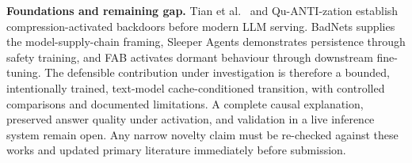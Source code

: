 \documentclass[11pt,a4paper]{article}
\begin{document}
\textbf{Foundations and remaining gap.} Tian et al.\ \cite{tian2022compression} and Qu-ANTI-zation \cite{hong2021quanti} establish compression-activated backdoors before modern LLM serving. BadNets \cite{gu2017badnets} supplies the model-supply-chain framing, Sleeper Agents \cite{hubinger2024sleeper} demonstrates persistence through safety training, and FAB \cite{gloaguen2026fab} activates dormant behaviour through downstream fine-tuning. The defensible contribution under investigation is therefore a bounded, intentionally trained, text-model cache-conditioned transition, with controlled comparisons and documented limitations. A complete causal explanation, preserved answer quality under activation, and validation in a live inference system remain open. Any narrow novelty claim must be re-checked against these works and updated primary literature immediately before submission.

\end{document}
